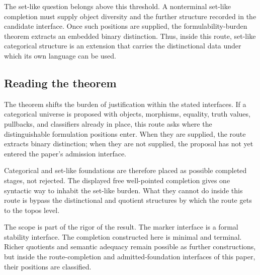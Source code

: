 \documentclass[11pt]{article}
\begin{document}
The set-like question belongs above this threshold.  A nonterminal
set-like completion must supply object diversity and the further
structure recorded in the candidate interface.  Once such positions are
supplied, the formulability-burden theorem extracts an embedded binary
distinction.  Thus, inside this route, set-like categorical structure is
an extension that carries the distinctional data under which its own
language can be used.

\subsection*{Reading the theorem}

The theorem shifts the burden of justification within the stated
interfaces.  If a categorical universe is proposed with objects,
morphisms, equality, truth values, pullbacks, and classifiers already in
place, this route asks where the distinguishable formulation positions
enter.  When they are supplied, the route extracts binary distinction;
when they are not supplied, the proposal has not yet entered the paper's
admission interface.

Categorical and set-like foundations are therefore placed as possible
completed stages, not rejected.  The displayed free well-pointed
completion gives one syntactic way to inhabit the set-like burden.  What
they cannot do inside this route is bypass the distinctional and quotient
structures by which the route gets to the topos level.

The scope is part of the rigor of the result.  The marker interface is a
formal stability interface.  The completion constructed here is minimal
and terminal.  Richer quotients and semantic adequacy remain possible as
further constructions, but inside the route-completion and
admitted-foundation interfaces of this paper, their positions are
classified.
\end{document}
